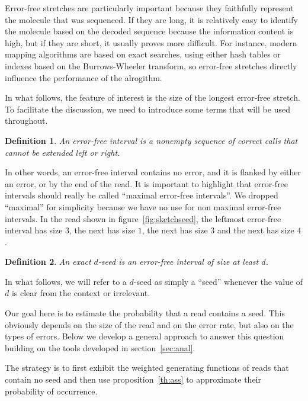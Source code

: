 \documentclass{article}
\newtheorem{definition}{Definition}
\begin{document}
Error-free stretches are particularly important because they faithfully
represent the molecule that was sequenced. If they are long, it is
relatively easy to identify the molecule based on the decoded sequence
because the information content is high, but if they are short, it usually
proves more difficult. For instance, modern mapping algorithms are based
on exact searches, using either hash tables or indexes based on the
Burrows-Wheeler transform, so error-free stretches directly influence the
performance of the alrogithm.

In what follows, the feature of interest is the size of the longest
error-free stretch. To facilitate the discussion, we need to introduce
some terms that will be used throughout.

\begin{definition}
\label{def:error-free-interval}
An error-free interval is a nonempty sequence of correct calls that cannot
be extended left or right.
\end{definition}

In other words, an error-free interval contains no error, and it is
flanked by either an error, or by the end of the read. It is important to
highlight that error-free intervals should really be called ``maximal
error-free intervals''. We dropped ``maximal'' for simplicity because we
have no use for non maximal error-free intervals. In the read shown in
figure~\ref{fig:sketchseed}, the leftmost error-free interval has size
$3$, the next has size $1$, the next has size $3$ and the next has size
$4$.

\begin{definition}
\label{def:seed}
An exact $d$-seed is an error-free interval of size at least $d$.
\end{definition}

In what follows, we will refer to a $d$-seed as simply a ``seed''
whenever the value of $d$ is clear from the context or irrelevant.

Our goal here is to estimate the probability that a read contains a seed.
This obviously depends on the size of the read and on the error rate, but
also on the types of errors. Below we develop a general approach to answer
this question building on the tools developed in
section~\ref{sec:anal}.

The strategy is to first exhibit the weighted generating functions of
reads that contain no seed and then use proposition~\ref{th:ass} to
approximate their probability of occurrence.
\end{document}
